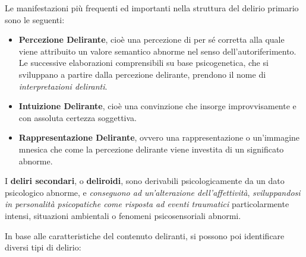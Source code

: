 \documentclass[]{article}
\begin{document}
Le manifestazioni più frequenti ed importanti nella struttura del
delirio primario sono le seguenti:

\begin{itemize}
\item
  \textbf{Percezione Delirante}, cioè una percezione di per sé corretta
  alla quale viene attribuito un valore semantico abnorme nel senso
  dell'autoriferimento. Le successive elaborazioni comprensibili su base
  psicogenetica, che si sviluppano a partire dalla percezione delirante,
  prendono il nome di \emph{interpretazioni deliranti}.
\item
  \textbf{Intuizione Delirante}, cioè una convinzione che insorge
  improvvisamente e con assoluta certezza soggettiva.
\item
  \textbf{Rappresentazione Delirante}, ovvero una rappresentazione o
  un'immagine mnesica che come la percezione delirante viene investita
  di un significato abnorme.
\end{itemize}

I \textbf{deliri secondari}, o \textbf{deliroidi}, sono derivabili
psicologicamente da un dato psicologico abnorme, e \emph{conseguono ad
un'alterazione dell'affettività}, \emph{sviluppandosi in personalità
psicopatiche come risposta ad eventi traumatici} particolarmente
intensi, situazioni ambientali o fenomeni psicosensoriali abnormi.

In base alle caratteristiche del contenuto deliranti, si possono poi
identificare diversi tipi di delirio:
\end{document}

